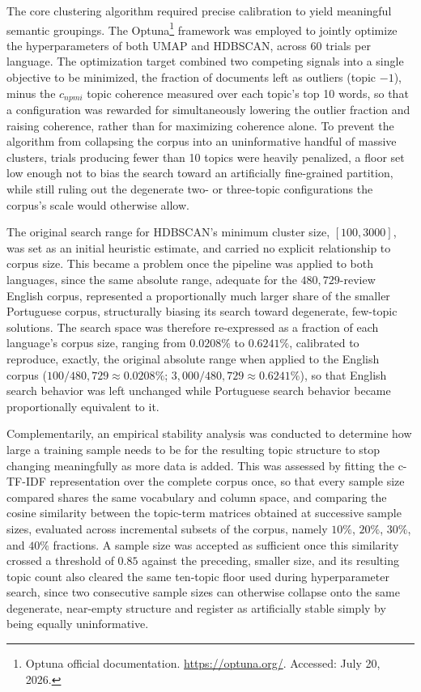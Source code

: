 The core clustering algorithm required precise calibration to yield meaningful semantic groupings. The Optuna\footnote{Optuna official documentation. \url{https://optuna.org/}. Accessed: July 20, 2026.} framework \cite{akiba:2019} was employed to jointly optimize the hyperparameters of both UMAP and HDBSCAN, across 60 trials per language. The optimization target combined two competing signals into a single objective to be minimized, the fraction of documents left as outliers (topic $-1$), minus the $c_{npmi}$ topic coherence measured over each topic's top 10 words, so that a configuration was rewarded for simultaneously lowering the outlier fraction and raising coherence, rather than for maximizing coherence alone. To prevent the algorithm from collapsing the corpus into an uninformative handful of massive clusters, trials producing fewer than 10 topics were heavily penalized, a floor set low enough not to bias the search toward an artificially fine-grained partition, while still ruling out the degenerate two- or three-topic configurations the corpus's scale would otherwise allow.

The original search range for HDBSCAN's minimum cluster size, $[100, 3000]$, was set as an initial heuristic estimate, and carried no explicit relationship to corpus size. This became a problem once the pipeline was applied to both languages, since the same absolute range, adequate for the $480{,}729$-review English corpus, represented a proportionally much larger share of the smaller Portuguese corpus, structurally biasing its search toward degenerate, few-topic solutions. The search space was therefore re-expressed as a fraction of each language's corpus size, ranging from $0.0208\%$ to $0.6241\%$, calibrated to reproduce, exactly, the original absolute range when applied to the English corpus ($100/480{,}729 \approx 0.0208\%$; $3{,}000/480{,}729 \approx 0.6241\%$), so that English search behavior was left unchanged while Portuguese search behavior became proportionally equivalent to it.

Complementarily, an empirical stability analysis was conducted to determine how large a training sample needs to be for the resulting topic structure to stop changing meaningfully as more data is added. This was assessed by fitting the c-TF-IDF representation over the complete corpus once, so that every sample size compared shares the same vocabulary and column space, and comparing the cosine similarity between the topic-term matrices obtained at successive sample sizes, evaluated across incremental subsets of the corpus, namely $10\%$, $20\%$, $30\%$, and $40\%$ fractions. A sample size was accepted as sufficient once this similarity crossed a threshold of $0.85$ against the preceding, smaller size, and its resulting topic count also cleared the same ten-topic floor used during hyperparameter search, since two consecutive sample sizes can otherwise collapse onto the same degenerate, near-empty structure and register as artificially stable simply by being equally uninformative.

